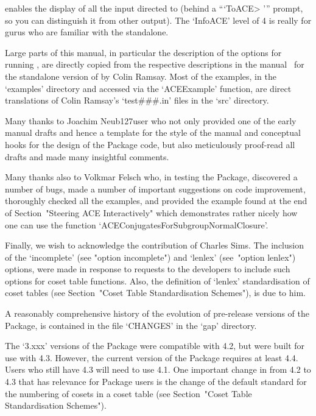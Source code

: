 enables the display of all the input  directed  to  {\ACE}  (behind  a
```ToACE> ''' prompt, so you can distinguish it  from  other  output).
The `InfoACE' level of 4 is really for gurus who are familiar with the
{\ACE} standalone.


Large parts of this manual,  in  particular  the  description  of  the
options for running {\ACE}, are directly copied  from  the  respective
descriptions in the manual~\cite{Ram99} for the standalone version  of
{\ACE} by Colin Ramsay.  Most  of  the  examples,  in  the  `examples'
directory and accessed  via  the  `ACEExample'  function,  are  direct
translations of Colin Ramsay's  `test\#\#\#.in'  files  in  the  `src'
directory.

Many thanks to Joachim Neub{\accent127u}ser who not only provided  one
of the early manual drafts and hence a template for the style  of  the
manual and conceptual hooks for the design of the  Package  code,  but
also meticulously proof-read  all  drafts  and  made  many  insightful
comments.

Many thanks also to Volkmar Felsch who, in testing the {\ACE} Package,
discovered a number of bugs, made a number of important suggestions on
code improvement, thoroughly checked all the  examples,  and  provided
the example found at the end of Section~"Steering  ACE  Interactively"
which  demonstrates  rather  nicely  how  one  can  use  the  function
`ACEConjugatesForSubgroupNormalClosure'.

Finally, we wish to acknowledge the contribution of Charles Sims.  The
inclusion of the `incomplete' (see "option incomplete")  and  `lenlex'
(see~"option lenlex") options, were made in response  to  requests  to
the  {\GAP}  developers  to  include  such  options  for  coset  table
functions. Also, the definition of `lenlex' standardisation  of  coset
tables (see Section~"Coset Table Standardisation Schemes"), is due  to
him.


A reasonably comprehensive history of  the  evolution  of  pre-release
versions of the {\ACE} Package, is contained in the file `CHANGES'  in
the `gap' directory. 

The `3.xxx' versions of the {\ACE} Package were compatible with {\GAP}
4.2, but were built for use with  {\GAP}  4.3.  However,  the  current
version of the {\ACE} Package requires at least {\GAP} 4.4. Users  who
still have {\GAP} 4.3 will need  to  use  {\ACE}  4.1.  One  important
change in {\GAP} from {\GAP} 4.2 to {\GAP} 4.3 that has relevance  for
{\ACE} Package users is the change of the  default  standard  for  the
numbering of  cosets  in  a  coset  table  (see  Section~"Coset  Table
Standardisation Schemes").

